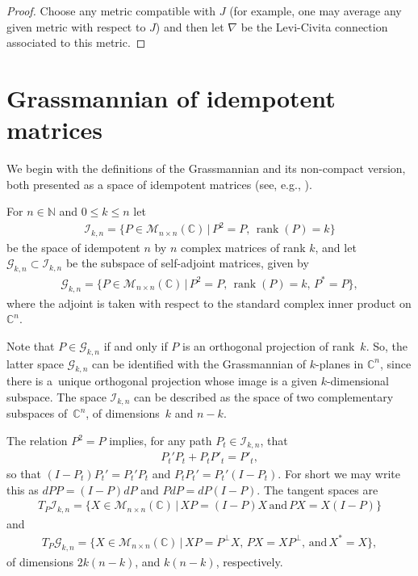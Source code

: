\documentclass[10pt,a4paper]{amsart}
\numberwithin{equation}{section}
\newcommand{\N}{\mathbb{N}}
\newcommand{\CC}{\mathbb{C}}
\newcommand{\cG}{{\mathcal G}}
\newcommand{\cI}{{\mathcal I}}
\begin{document}
\begin{proof}Choose any metric compatible with $J$ (for example, one may average any given metric with respect to $J$) and then let $\nabla$ be the Levi-Civita connection associated to this metric.
\end{proof}

\section{Grassmannian of idempotent matrices} \label{sec;grass}

We begin with the definitions of the Grassmannian and its non-compact version, both presented as a space of idempotent matrices (see, e.g., \cite[Problem~5-C]{MS}).

\begin{defn}For $n \in \N$ and $0 \leq k \leq n$ let
\begin{gather*}
\cI_{k,n} = \big\{ P \in \mathcal{M}_{n \times n}(\CC) \,| \, P^2 = P, \, \operatorname{rank}(P) = k \big\}
\end{gather*}
be the space of idempotent $n$ by $n$ complex matrices of rank $k$, and let $ \cG_{k,n} \subset \cI_{k,n}$ be the subspace of self-adjoint matrices, given by
\begin{gather*}
\cG_{k,n} = \big\{ P \in \mathcal{M}_{n \times n}(\CC)\, | \, P^2 = P ,\, \operatorname{rank}(P) = k, \, P^* = P \big\},
\end{gather*}
where the adjoint is taken with respect to the standard complex inner product on $\CC^n$.
\end{defn}

Note that $P \in \cG_{k,n}$ if and only if $P$ is an orthogonal projection of rank~$k$. So, the latter space $\cG_{k,n}$ can be identified with the Grassmannian of $k$-planes in $\CC^n$, since there is a~unique orthogonal projection whose image is a given $k$-dimensional subspace. The space $\cI_{k,n}$ can be described as the space of two complementary subspaces of~$\CC^n$, of dimensions~$k$ and $n-k$.

The relation $P^2 = P$ implies, for any path $P_t \in \cI_{k,n}$, that
\begin{gather*}
P_t' P_t + P_t P'_t = P'_t,
\end{gather*}
so that $(I-P_t)P_t' = P_t'P_t$ and $P_t P_t' = P_t' (I-P_t)$. For short we may write this as $dPP= (I-P)dP$ and $P dP= dP (I-P)$. The tangent spaces are
\begin{gather*}
T_P\cI_{k,n} = \big\{ X \in \mathcal{M}_{n \times n}(\CC)\, |\, XP= (I-P)X \, \textrm{and} \, PX= X(I-P) \big\}
\end{gather*}
and
\begin{gather*}
T_P \cG_{k,n} = \big\{ X \in \mathcal{M}_{n \times n}(\CC) \,| \, XP = P^\perp X, \, PX= X P^\perp , \, \textrm{and} \, X^*=X \big\},
\end{gather*}
of dimensions $2k(n-k)$, and $k(n-k)$, respectively.
\end{document}
